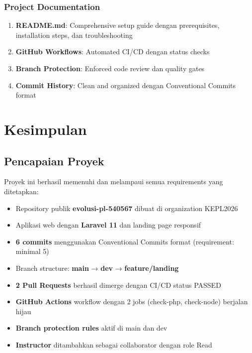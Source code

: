 \documentclass[a4paper,oneside,11pt]{book}
\begin{document}
\subsection{Project Documentation}

\begin{enumerate}
    \item \textbf{README.md}: Comprehensive setup guide dengan prerequisites, installation steps, dan troubleshooting
    \item \textbf{GitHub Workflows}: Automated CI/CD dengan status checks
    \item \textbf{Branch Protection}: Enforced code review dan quality gates
    \item \textbf{Commit History}: Clean and organized dengan Conventional Commits format
\end{enumerate}

\newpage


\chapter{Kesimpulan}

\section{Pencapaian Proyek}

Proyek ini berhasil memenuhi dan melampaui semua requirements yang ditetapkan:

\begin{itemize}
    \item[✓] Repository publik \textbf{evolusi-pl-540567} dibuat di organization KEPL2026
    \item[✓] Aplikasi web dengan \textbf{Laravel 11} dan landing page responsif
    \item[✓] \textbf{6 commits} menggunakan Conventional Commits format (requirement: minimal 5)
    \item[✓] Branch structure: \textbf{main} → \textbf{dev} → \textbf{feature/landing}
    \item[✓] \textbf{2 Pull Requests} berhasil dimerge dengan CI/CD status PASSED
    \item[✓] \textbf{GitHub Actions} workflow dengan 2 jobs (check-php, check-node) berjalan hijau
    \item[✓] \textbf{Branch protection rules} aktif di main dan dev
    \item[✓] \textbf{Instructor} ditambahkan sebagai collaborator dengan role Read
\end{itemize}
\end{document}
